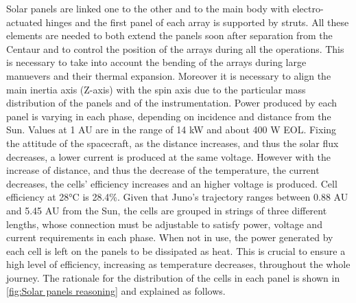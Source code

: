  Solar panels are linked one to the other and to the main body with electro-actuated hinges and the first panel of each array is supported by struts. All these elements are needed to both extend the panels soon after separation from the Centaur and to control the position of the arrays during all the operations. This is necessary to take into account the bending of the arrays during large manuevers and their thermal expansion. Moreover it is necessary to align the main inertia axis (Z-axis) with the spin axis due to the particular mass distribution of the panels and of the instrumentation. Power produced by each panel is varying in each phase, depending on incidence and distance from the Sun. Values at 1 AU are in the range of 14 kW and about 400 W EOL. Fixing the attitude of the spacecraft, as the distance increases, and thus the solar flux decreases, a lower current is produced at the same voltage. However with the increase of distance, and thus the decrease of the temperature, the current decreases, the cells' efficiency increases and an higher voltage is produced. Cell efficiency at 28°C is 28.4\%.  Given that Juno's trajectory ranges between 0.88 AU and 5.45 AU from the Sun, the cells are grouped in strings of three different lengths, whose connection must be adjustable to satisfy power, voltage and current requirements in each phase. When not in use, the power generated by each cell is left on the panels to be dissipated as heat.\cite{solar_panels_coef} This is crucial to ensure a high level of efficiency, increasing as temperature decreases, throughout the whole journey. The rationale for the distribution of the cells in each panel is shown in \autoref{fig:Solar panels reasoning} and explained as follows. 
